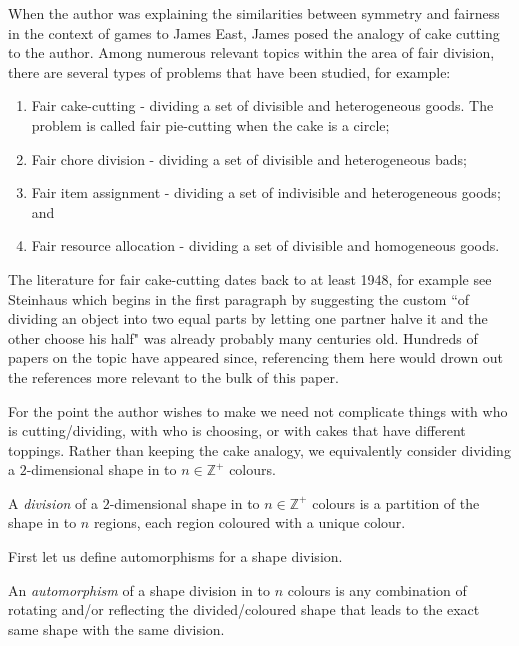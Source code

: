 When the author was explaining the similarities between symmetry and fairness in the context of games to James East, James posed the analogy of cake cutting to the author. Among numerous relevant topics within the area of fair division, there are several types of problems that have been studied, for example:
\begin{enumerate}
	\item Fair cake-cutting - dividing a set of divisible and heterogeneous goods. The problem is called fair pie-cutting when the cake is a circle;
	\item Fair chore division - dividing a set of divisible and heterogeneous bads;
	\item Fair item assignment - dividing a set of indivisible and heterogeneous goods; and
	\item Fair resource allocation - dividing a set of divisible and homogeneous goods.
\end{enumerate}

The literature for fair cake-cutting dates back to at least 1948, for example see Steinhaus \cite{Steinhauscakecutting} which begins in the first paragraph by suggesting the custom ``of dividing an object into two equal parts by letting one partner halve it and the other choose his half" was already probably many centuries old. Hundreds of papers on the topic have appeared since, referencing them here would drown out the references more relevant to the bulk of this paper. 

For the point the author wishes to make we need not complicate things with who is cutting/dividing, with who is choosing, or with cakes that have different toppings. Rather than keeping the cake analogy, we equivalently consider dividing a $2$-dimensional shape in to $n \in \mathbb{Z}^+$ colours. 

\begin{definition}
	A \textit{division} of a $2$-dimensional shape in to $n \in \mathbb{Z}^+$ colours is a partition of the shape in to $n$ regions, each region coloured with a unique colour. 
\end{definition}

First let us define automorphisms for a shape division.

\begin{definition}
	An \textit{automorphism} of a shape division in to $n$ colours is any combination of rotating and/or reflecting the divided/coloured shape that leads to the exact same shape with the same division. 
\end{definition}

